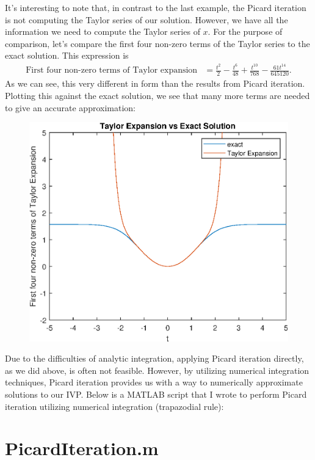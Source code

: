 \documentclass[10pt,a4paper]{article}
\theoremstyle{theorem}
\theoremstyle{definition}
\begin{document}
It's interesting to note that, in contrast to the last example, the Picard iteration is not computing the Taylor series of our solution.  However, we have all the information we need to compute the Taylor series of $x$. For the purpose of comparison, let's compare the first four non-zero terms of the Taylor series to the exact solution. This expression is
\begin{align*}
\text{First four non-zero terms of Taylor expansion} &= \frac{t^2}{2} - \frac{t^6}{48} + \frac{t^{10}}{768} - \frac{61 t^{14}}{645120}.
\end{align*}
As we can see, this very different in form than the results from Picard iteration. Plotting this against the exact solution, we see that many more terms are needed to give an accurate approximation:
\begin{figure}[ht]
    \centering
    \includegraphics[scale=0.75]{TaylorSeries}
\end{figure}


Due to the difficulties of analytic integration, applying Picard iteration directly, as we did above, is often not feasible. However, by utilizing numerical integration techniques, Picard iteration provides us with a way to numerically approximate solutions to our IVP. Below is a MATLAB script that I wrote to perform Picard iteration utilizing numerical integration (trapazodial rule): 
\pagebreak
\section*{PicardIteration.m}

\end{document}
